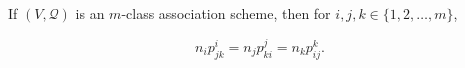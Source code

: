 If $(V, \mathcal{Q})$ is an $m$-class association scheme, then for $i, j, k \in \{1, 2, \ldots, m\}$,

$$n_i p_{jk}^i = n_j p_{ki}^j = n_k p_{ij}^k.$$
